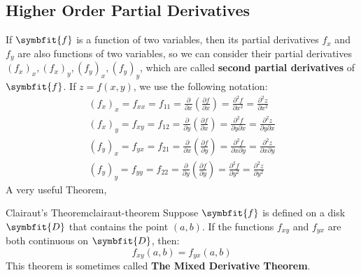 \documentclass[math,code]{amznotes}
\theoremstyle{remark}
\begin{document}
\subsection{Higher Order Partial Derivatives}
If $\symbfit{f}$ is a function of two variables, then its partial derivatives $f_x$ and $f_y$ are also functions of two variables, so we can consider their partial derivatives $(f_x)_x, (f_x)_y, (f_y)_x, (f_y)_y$, which are called {\color{red} \textbf{second partial derivatives}} of $\symbfit{f}$. If $z=f(x,y)$, we use the following notation:
\begin{gather*}
    (f_x)_x=f_{xx}=f_{11}=\frac{\partial}{\partial x}(\frac{\partial f}{\partial x})=\frac{\partial ^2 f}{\partial x^2}=\frac{\partial ^2 z}{\partial x^2} \\
    (f_x)_y=f_{xy}=f_{12}=\frac{\partial}{\partial y}(\frac{\partial f}{\partial x})=\frac{\partial ^2 f}{\partial y \partial x}=\frac{\partial ^2 z}{\partial y \partial x} \\
    (f_y)_x=f_{yx}=f_{21}=\frac{\partial}{\partial x}(\frac{\partial f}{\partial y})=\frac{\partial ^2 f}{\partial x \partial y}=\frac{\partial ^2 z}{\partial x \partial y} \\
    (f_y)_y=f_{yy}=f_{22}=\frac{\partial}{\partial y}(\frac{\partial f}{\partial y})=\frac{\partial ^2 f}{\partial y^2}=\frac{\partial ^2 z}{\partial y^2}
\end{gather*}
A very useful Theorem,
\begin{thmbox}{Clairaut's Theorem}{clairaut-theorem}
    Suppose $\symbfit{f}$ is defined on a disk $\symbfit{D}$ that contains the point $(a,b)$. If the functions $f_{xy}$ and $f_{yx}$ are both continuous on $\symbfit{D}$, then:
    \begin{displaymath}
        f_{xy}(a,b)=f_{yx}(a,b)
    \end{displaymath}
    This theorem is sometimes called {\color{red} \textbf{The Mixed Derivative Theorem}}.
\end{thmbox}
\end{document}
